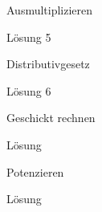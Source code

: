\documentclass[lerntheke,12pt,a5paper,landscape]{arbeitsblatt}
\begin{document}
\begin{karte1}{Ausmultiplizieren}

\end{karte1}

\begin{loesungskarte}{Lösung 5}

\end{loesungskarte}

\begin{karte2}{Distributivgesetz}

\end{karte2}

\begin{loesungskarte}{Lösung 6}

\end{loesungskarte}

\begin{karte2}{Geschickt rechnen}

\end{karte2}

\begin{loesungskarte}{Lösung}

\end{loesungskarte}

\begin{karte1}{Potenzieren}

\end{karte1}

\begin{loesungskarte}{Lösung}

\end{loesungskarte}
\end{document}
